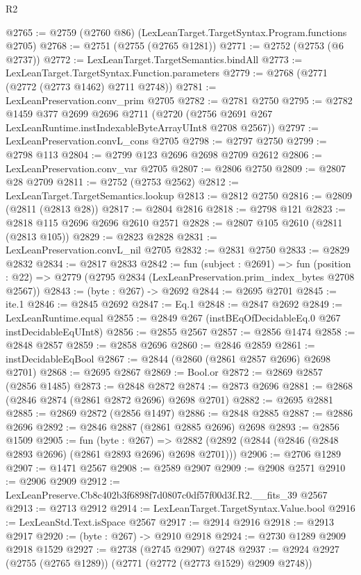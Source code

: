 \begin{lexlean}{R2}
\begin{coremodule}
@2765 := @2759 (@2760 @86) (LexLeanTarget.TargetSyntax.Program.functions @2705)
@2768 := @2751 (@2755 (@2765 @1281))
@2771 := @2752 (@2753 (@6 @2737))
@2772 := LexLeanTarget.TargetSemantics.bindAll
@2773 := LexLeanTarget.TargetSyntax.Function.parameters
@2779 := @2768 (@2771 (@2772 (@2773 @1462) @2711 @2748))
@2781 := LexLeanPreservation.conv_prim @2705
@2782 := @2781 @2750
@2795 := @2782
    @1459
    @377
    @2699
    @2696
    @2711
    (@2720 (@2756 @2691 @267 LexLeanRuntime.instIndexableByteArrayUInt8 @2708 @2567))
@2797 := LexLeanPreservation.convL_cons @2705
@2798 := @2797 @2750
@2799 := @2798 @113
@2804 := @2799 @123 @2696 @2698 @2709 @2612
@2806 := LexLeanPreservation.conv_var @2705
@2807 := @2806 @2750
@2809 := @2807 @28 @2709
@2811 := @2752 (@2753 @2562)
@2812 := LexLeanTarget.TargetSemantics.lookup
@2813 := @2812 @2750
@2816 := @2809 (@2811 (@2813 @28))
@2817 := @2804 @2816
@2818 := @2798 @121
@2823 := @2818 @115 @2696 @2696 @2610 @2571
@2828 := @2807 @105 @2610 (@2811 (@2813 @105))
@2829 := @2823 @2828
@2831 := LexLeanPreservation.convL_nil @2705
@2832 := @2831 @2750
@2833 := @2829 @2832
@2834 := @2817 @2833
@2842 := fun (subject : @2691) =>
  fun (position : @22) => @2779 (@2795 @2834 (LexLeanPreservation.prim_index_bytes @2708 @2567))
@2843 := (byte : @267) -> @2692
@2844 := @2695 @2701
@2845 := ite.{1}
@2846 := @2845 @2692
@2847 := Eq.{1}
@2848 := @2847 @2692
@2849 := LexLeanRuntime.equal
@2855 := @2849 @267 (instBEqOfDecidableEq.{0} @267 instDecidableEqUInt8)
@2856 := @2855 @2567
@2857 := @2856 @1474
@2858 := @2848 @2857
@2859 := @2858 @2696
@2860 := @2846 @2859
@2861 := instDecidableEqBool
@2867 := @2844 (@2860 (@2861 @2857 @2696) @2698 @2701)
@2868 := @2695 @2867
@2869 := Bool.or
@2872 := @2869 @2857 (@2856 @1485)
@2873 := @2848 @2872
@2874 := @2873 @2696
@2881 := @2868 (@2846 @2874 (@2861 @2872 @2696) @2698 @2701)
@2882 := @2695 @2881
@2885 := @2869 @2872 (@2856 @1497)
@2886 := @2848 @2885
@2887 := @2886 @2696
@2892 := @2846 @2887 (@2861 @2885 @2696) @2698
@2893 := @2856 @1509
@2905 := fun (byte : @267) =>
  @2882 (@2892 (@2844 (@2846 (@2848 @2893 @2696) (@2861 @2893 @2696) @2698 @2701)))
@2906 := @2706 @1289
@2907 := @1471 @2567
@2908 := @2589 @2907
@2909 := @2908 @2571
@2910 := @2906 @2909
@2912 := LexLeanPreserve.Cb8c402b3f6898f7d0807c0df57f00d3f.R2.__fits_39 @2567
@2913 := @2713 @2912
@2914 := LexLeanTarget.TargetSyntax.Value.bool
@2916 := LexLeanStd.Text.isSpace @2567
@2917 := @2914 @2916
@2918 := @2913 @2917
@2920 := (byte : @267) -> @2910 @2918
@2924 := @2730 @1289 @2909 @2918 @1529
@2927 := @2738 (@2745 @2907) @2748
@2937 := @2924 @2927 (@2755 (@2765 @1289)) (@2771 (@2772 (@2773 @1529) @2909 @2748))

\end{coremodule}
\end{lexlean}
